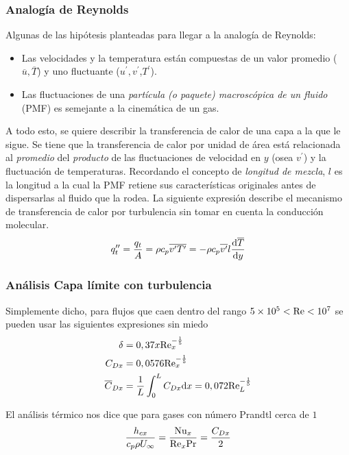 \subsubsection{Analogía de Reynolds}
Algunas de las hipótesis planteadas para llegar a la analogía de Reynolds:
\begin{itemize}
    \item Las velocidades y la temperatura están compuestas de un valor promedio ($\overline{u},\overline{T}$) y uno fluctuante ($u^\prime,v^\prime$,$T^\prime$). 
    \item Las fluctuaciones de una \emph{partícula (o paquete) macroscópica de un fluido} (PMF) es semejante a la cinemática de un gas. 
\end{itemize}

A todo esto, se quiere describir la transferencia de calor de una capa a la que le sigue. Se tiene que la transferencia de calor por unidad de área está relacionada al \emph{promedio} del \emph{producto} de las fluctuaciones de velocidad en $y$ (osea $v^\prime$) y la fluctuación de temperaturas. Recordando el concepto de \emph{longitud de mezcla}, $l$ es la longitud a la cual la PMF retiene sus características originales antes de dispersarlas al fluido que la rodea. La siguiente expresión describe el mecanismo de transferencia de calor por turbulencia sin tomar en cuenta la conducción molecular.
\begin{equation}
    q^{\prime \prime}_t=\frac{q_t}{A}=\rho c_p \overline{v^\prime T^\prime }=-\rho c_p \overline{v^\prime}l \frac{\textrm{d} \overline{T}}{\textrm{d} y}
\end{equation}
\subsubsection{Análisis Capa límite con turbulencia}
Simplemente dicho, para flujos que caen dentro del rango $\num{5e5}<\textrm{Re} <\num{e7}$ se pueden usar las siguientes expresiones sin miedo 
\begin{align}
    \delta&=0,37x\textrm{Re}_x^{-\frac{1}{5}}\\
    C_{Dx}&=0,0576 \textrm{Re}_x^{-\frac{1}{5}} \\
    \overline{C}_{Dx}&=\frac{1}{L}\int^L_0 C_{Dx} \textrm{d} x=0,072\textrm{Re}_L^{-\frac{1}{5}}
\end{align}

El análisis térmico nos dice que para gases con número Prandtl cerca de $1$ 
\begin{equation}
   \frac{h_{cx}}{c_p \rho U_\infty}=\frac{\textrm{Nu}_x}{\textrm{Re}_x \textrm{Pr}}=\frac{C_{Dx}}{2}
\end{equation}

